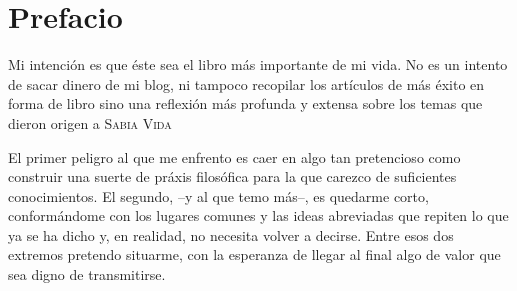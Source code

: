 \chapter{Prefacio}

Mi intención es que éste sea el libro más importante de mi vida. No es un intento de sacar dinero de mi blog, ni tampoco recopilar los artículos de más éxito en forma de libro sino una reflexión más profunda y extensa sobre los temas que dieron origen a \textsc{Sabia Vida}

El primer peligro al que me enfrento es caer en algo tan pretencioso como construir una suerte de práxis filosófica para la que carezco de suficientes conocimientos. El segundo, --y al que temo más--, es quedarme corto, conformándome con los lugares comunes y las ideas abreviadas que repiten lo que ya se ha dicho y, en realidad, no necesita volver a decirse. Entre esos dos extremos pretendo situarme, con la esperanza de llegar al final algo de valor que sea digno de transmitirse.


